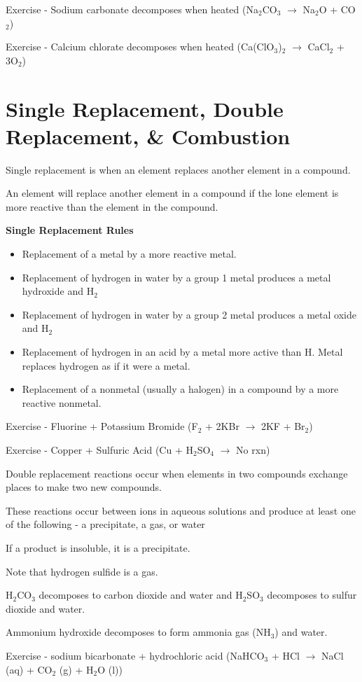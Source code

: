 \documentclass[../hchem.tex]{subfiles}
\begin{document}
Exercise - Sodium carbonate decomposes when heated (Na$_2$CO$_3$ $\rightarrow$ Na$_2$O + CO$_2$)

Exercise - Calcium chlorate decomposes when heated (Ca(ClO$_3$)$_2$ $\rightarrow$ CaCl$_2$ + 3O$_2$)
\section{Single Replacement, Double Replacement, \& Combustion}
Single replacement is when an element replaces another element in a compound.

An element will replace another element in a compound if the lone element is more reactive than the element in the compound.

\textbf{Single Replacement Rules}
\begin{itemize}
    \item Replacement of a metal by a more reactive metal.
    \item Replacement of hydrogen in water by a group 1 metal produces a metal hydroxide and H$_2$
    \item Replacement of hydrogen in water by a group 2 metal produces a metal oxide and H$_2$
    \item Replacement of hydrogen in an acid by a metal more active than H. Metal replaces hydrogen as if it were a metal.
    \item Replacement of a nonmetal (usually a halogen) in a compound by a more reactive nonmetal.
\end{itemize}

Exercise - Fluorine + Potassium Bromide (F$_2$ + 2KBr $\rightarrow$ 2KF + Br$_2$)

Exercise - Copper + Sulfuric Acid (Cu + H$_2$SO$_4$ $\rightarrow$ No rxn)

Double replacement reactions occur when elements in two compounds exchange places to make two new compounds.

These reactions occur between ions in aqueous solutions and produce at least one of the following - a precipitate, a gas, or water

If a product is insoluble, it is a precipitate.

Note that hydrogen sulfide is a gas.

H$_2$CO$_3$ decomposes to carbon dioxide and water and H$_2$SO$_3$ decomposes to sulfur dioxide and water.

Ammonium hydroxide decomposes to form ammonia gas (NH$_3$) and water.

Exercise - sodium bicarbonate + hydrochloric acid (NaHCO$_3$ + HCl $\rightarrow$ NaCl (aq) + CO$_2$ (g) + H$_2$O (l))
\end{document}
